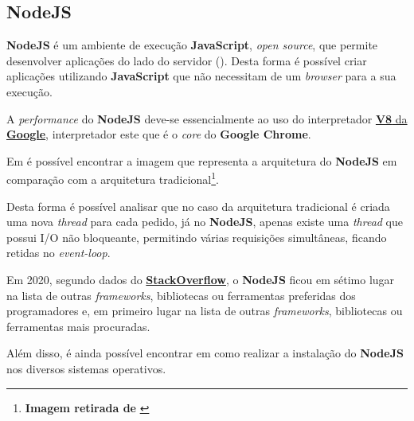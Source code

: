 \subsection{NodeJS}

\begin{minipage}{.3\textwidth}
\end{minipage}
\begin{minipage}{.7\textwidth}
	\minipagerestore
	\textbf{NodeJS} é um ambiente de execução \textbf{JavaScript}, \textit{open source}, que permite desenvolver aplicações do lado do servidor (). Desta forma é possível criar aplicações utilizando \textbf{JavaScript} que não necessitam de um \textit{browser} para a sua execução.

	A \textit{performance} do \textbf{NodeJS} deve-se essencialmente ao uso do interpretador \href{https://v8.dev}{\textbf{V8} da \textbf{Google}}, interpretador este que é o \textit{core} do \textbf{Google Chrome}.

\end{minipage}

Em  é possível encontrar a imagem que representa a arquitetura do \textbf{NodeJS} em comparação com a arquitetura tradicional\footnote{\textbf{Imagem retirada de} \cite{caseByCaseNode}}.

Desta forma é possível analisar que no caso da arquitetura tradicional é criada uma nova \textit{thread} para cada pedido, já no \textbf{NodeJS}, apenas existe uma \textit{thread} que possui I/O não bloqueante, permitindo várias requisições simultâneas, ficando retidas no \textit{event-loop}.

Em 2020, segundo dados do \href{https://insights.stackoverflow.com/survey/2020#technology-most-loved-dreaded-and-wanted-other-frameworks-libraries-and-tools-loved3}{\textbf{StackOverflow}}, o \textbf{NodeJS} ficou em sétimo lugar na lista de outras \textit{frameworks}, bibliotecas ou ferramentas preferidas dos programadores e, em primeiro lugar na lista de outras \textit{frameworks}, bibliotecas ou ferramentas mais procuradas.

Além disso, é ainda possível encontrar em  como realizar a instalação do \textbf{NodeJS} nos diversos sistemas operativos.
